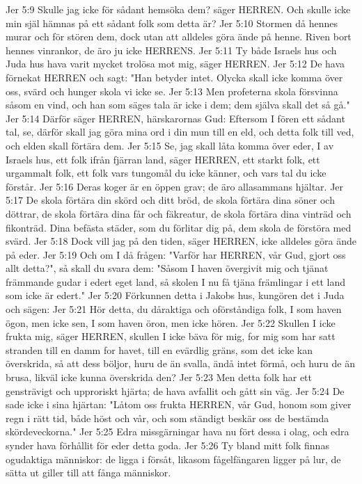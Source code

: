 Jer 5:9  Skulle jag icke för sådant hemsöka dem? säger HERREN. Och skulle icke min själ hämnas på ett sådant folk som detta är?
Jer 5:10  Stormen då hennes murar och för stören dem, dock utan att alldeles göra ände på henne. Riven bort hennes vinrankor, de äro ju icke HERRENS.
Jer 5:11  Ty både Israels hus och Juda hus hava varit mycket trolösa mot mig, säger HERREN.
Jer 5:12  De hava förnekat HERREN och sagt: "Han betyder intet. Olycka skall icke komma över oss, svärd och hunger skola vi icke se.
Jer 5:13  Men profeterna skola försvinna såsom en vind, och han som säges tala är icke i dem; dem själva skall det så gå."
Jer 5:14  Därför säger HERREN, härskarornas Gud: Eftersom I fören ett sådant tal, se, därför skall jag göra mina ord i din mun till en eld, och detta folk till ved, och elden skall förtära dem.
Jer 5:15  Se, jag skall låta komma över eder, I av Israels hus, ett folk ifrån fjärran land, säger HERREN, ett starkt folk, ett urgammalt folk, ett folk vars tungomål du icke känner, och vars tal du icke förstår.
Jer 5:16  Deras koger är en öppen grav; de äro allasammans hjältar.
Jer 5:17  De skola förtära din skörd och ditt bröd, de skola förtära dina söner och döttrar, de skola förtära dina får och fäkreatur, de skola förtära dina vinträd och fikonträd. Dina befästa städer, som du förlitar dig på, dem skola de förstöra med svärd.
Jer 5:18  Dock vill jag på den tiden, säger HERREN, icke alldeles göra ände på eder.
Jer 5:19  Och om I då frågen: "Varför har HERREN, vår Gud, gjort oss allt detta?", så skall du svara dem: "Såsom I haven övergivit mig och tjänat främmande gudar i edert eget land, så skolen I nu få tjäna främlingar i ett land som icke är edert."
Jer 5:20  Förkunnen detta i Jakobs hus, kungören det i Juda och sägen:
Jer 5:21  Hör detta, du dåraktiga och oförståndiga folk, I som haven ögon, men icke sen, I som haven öron, men icke hören.
Jer 5:22  Skullen I icke frukta mig, säger HERREN, skullen I icke bäva för mig, for mig som har satt stranden till en damm for havet, till en evärdlig gräns, som det icke kan överskrida, så att dess böljor, huru de än svalla, ändå intet förmå, och huru de än brusa, likväl icke kunna överskrida den?
Jer 5:23  Men detta folk har ett gensträvigt och upproriskt hjärta; de hava avfallit och gått sin väg.
Jer 5:24  De sade icke i sina hjärtan: "Låtom oss frukta HERREN, vår Gud, honom som giver regn i rätt tid, både höst och vår, och som ständigt beskär oss de bestämda skördeveckorna."
Jer 5:25  Edra missgärningar hava nu fört dessa i olag, och edra synder hava förhållit för eder detta goda.
Jer 5:26  Ty bland mitt folk finnas ogudaktiga människor: de ligga i försåt, likasom fågelfängaren ligger på lur, de sätta ut giller till att fånga människor.
